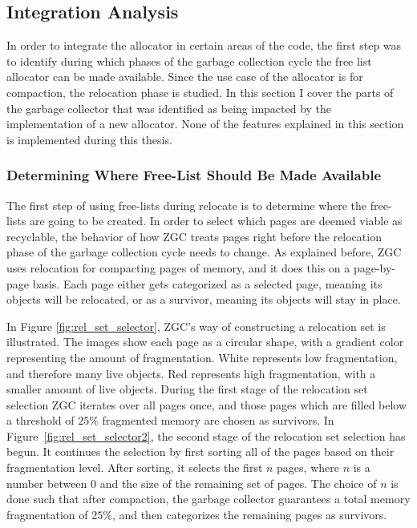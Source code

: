 \subsection{Integration Analysis}
In order to integrate the allocator in certain areas of the code, the first step was to identify during which phases of the garbage collection cycle the free list allocator can be made available. Since the use case of the allocator is for compaction, the relocation phase is studied. In this section I cover the parts of the garbage collector that was identified as being impacted by the implementation of a new allocator. None of the features explained in this section is implemented during this thesis.

\subsubsection{Determining Where Free-List Should Be Made Available}
\label{sec:analyse-select}
The first step of using free-lists during relocate is to determine where the free-lists are going to be created. In order to select which pages are deemed viable as recyclable, the behavior of how ZGC treats pages right before the relocation phase of the garbage collection cycle needs to change. As explained before, ZGC uses relocation for compacting pages of memory, and it does this on a page-by-page basis. Each page either gets categorized as a selected page, meaning its objects will be relocated, or as a survivor, meaning its objects will stay in place. 

In Figure \ref{fig:rel_set_selector}, ZGC's way of constructing a relocation set is illustrated. The images show each page as a circular shape, with a gradient color representing the amount of fragmentation. White represents low fragmentation, and therefore many live objects. Red represents high fragmentation, with a smaller amount of live objects. During the first stage of the relocation set selection ZGC iterates over all pages once, and those pages which are filled below a threshold of $25\%$ fragmented memory are chosen as survivors. In Figure~\ref{fig:rel_set_selector2}, the second stage of the relocation set selection has begun. It continues the selection by first sorting all of the pages based on their fragmentation level. After sorting, it selects the first $n$ pages, where $n$ is a number between 0 and the size of the remaining set of pages. The choice of $n$ is done such that after compaction, the garbage collector guarantees a total memory fragmentation of $25\%$, and then categorizes the remaining pages as survivors.

